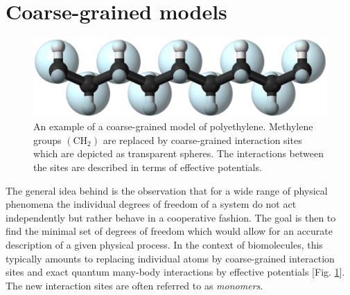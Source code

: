 \documentclass[12pt]{report}
\begin{document}
\section{Coarse-grained models}
%
\begin{figure}
\center
\includegraphics[width = 1.01\textwidth]{chapter4Figs/coarseGraining.eps}
\caption{\label{fig:coarseGraining}%
An example of a coarse-grained model of polyethylene. Methylene groups $(\mathrm{CH}_{2})$ are replaced by coarse-grained interaction sites which are depicted as transparent spheres. The interactions between the sites are described in terms of effective potentials.
}
\end{figure}
% 
The general idea behind  is the observation that for a wide range of physical phenomena the individual degrees of freedom of a system do not act independently but rather behave in a cooperative fashion. The goal is then to find the minimal set of degrees of freedom which would allow for an accurate description of a given physical process. In the context of biomolecules, this typically amounts to replacing individual atoms by coarse-grained interaction sites and exact quantum many-body interactions by effective potentials [Fig. \ref{fig:coarseGraining}]. The new interaction sites are often referred to as \textit{monomers}. 
\end{document}
